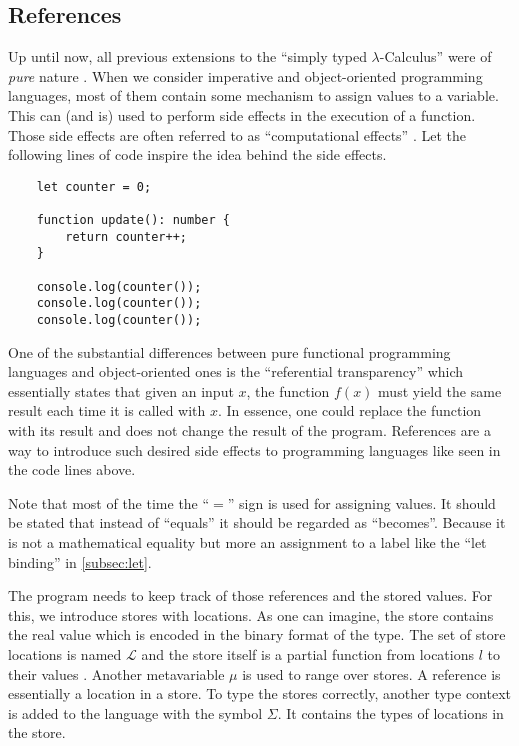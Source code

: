 \subsection{References}

Up until now, all previous extensions to the ``simply
typed $\lambda$-Calculus'' were of \textit{pure} nature \cite{pierce2002ProgLang}.
When we consider imperative and object-oriented programming languages,
most of them contain some mechanism to assign values to a variable.
This can (and is) used to perform side effects in the execution
of a function. Those side effects are often referred to as 
``computational effects'' \cite{pierce2002ProgLang}. Let the
following lines of code inspire the idea behind the side effects.

\begin{verbatim}
    let counter = 0;

    function update(): number {
        return counter++;
    }

    console.log(counter());
    console.log(counter());
    console.log(counter());
\end{verbatim}

One of the substantial differences between pure functional programming
languages and object-oriented ones is the ``referential transparency''
which essentially states that given an input $x$, the function $f(x)$
must yield the same result each time it is called with $x$. In essence,
one could replace the function with its result and does not change
the result of the program. References are a way to introduce such
desired side effects to programming languages like seen in the
code lines above.

Note that most of the time the ``$=$'' sign is used for assigning values. It should be
stated that instead of ``equals'' it should be regarded as ``becomes''.
Because it is not a mathematical equality but more an assignment
to a label like the ``let binding'' in \ref{subsec:let}.

The program needs to keep track of those references and the stored values.
For this, we introduce stores with locations.
As one can imagine, the store contains the real value which is encoded
in the binary format of the type. The set of store locations is named $\mathcal{L}$
and the store itself is a partial function from locations $l$ to their values
\cite{pierce2002ProgLang}. Another metavariable $\mu$ is used to range
over stores. A reference is essentially a location in a store.
To type the stores correctly, another type context is added to the language
with the symbol $\Sigma$. It contains the types of locations in the store.

